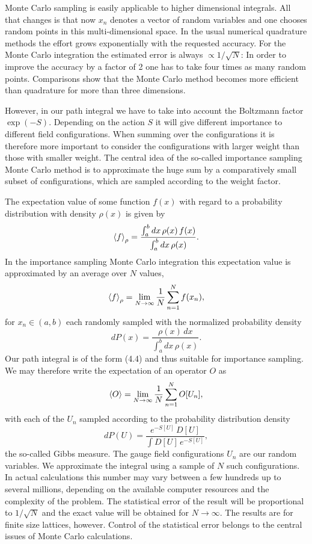 Monte Carlo sampling is easily applicable to higher dimensional integrals.
All that changes is that now $x_n$ denotes a vector of random variables and one
chooses random points in this multi-dimensional space. In the usual numerical
quadrature methods the effort grows exponentially with the requested accuracy. For the Monte Carlo integration the estimated error is always $\propto 1/\sqrt{N}$:
In order to improve the accuracy by a factor of 2 one has to take four times
as many random points. Comparisons show that the Monte Carlo method
becomes more efficient than quadrature for more than three dimensions.

However, in our path integral we have to take into account the Boltzmann
factor $\exp(-S)$. Depending on the action $S$ it will give different importance
to different field configurations. When summing over the configurations it is
therefore more important to consider the configurations with larger weight
than those with smaller weight. The central idea of the so-called importance
sampling Monte Carlo method is to approximate the huge sum by a comparatively small subset of configurations, which are sampled according to the
weight factor.

The expectation value of some function $f(x)$ with regard to a probability
distribution with density $\rho(x)$ is given by
\begin{equation}
  \left\langle f \right\rangle_\rho = \frac{\int_a^b dx\,\rho(x)\,f(x)}{\int_a^b dx\,\rho(x)}.
\end{equation}
In the importance sampling Monte Carlo integration this expectation value is
approximated by an average over $N$ values,
\begin{equation}
  \left\langle f \right\rangle_\rho = \lim_{N\to\infty}\frac{1}{N}\sum_{n=1}^{N} f(x_n),
\end{equation}
for $x_n \in (a,b)$ each randomly sampled with the normalized probability density
\begin{equation}
  dP(x) = \frac{\rho(x)\,dx}{\int_a^b dx\,\rho(x)}.
\end{equation}
Our path integral is of the form (4.4) and thus suitable for importance sampling. We may therefore write the expectation of an operator $O$ as
\begin{equation}
  \left\langle O \right\rangle = \lim_{N\to\infty}\frac{1}{N}\sum_{n=1}^{N} O[U_n],
\end{equation}
with each of the $U_n$ sampled according to the probability distribution density
\begin{equation}
  dP(U) = \frac{e^{-S[U]}\,D[U]}{\int D[U]\,e^{-S[U]}},
\end{equation}
the so-called Gibbs measure. The gauge field configurations $U_n$ are our random
variables. We approximate the integral using a sample of $N$ such configurations. In actual calculations this number may vary between a few hundreds
up to several millions, depending on the available computer resources and the
complexity of the problem. The statistical error of the result will be proportional to $1/\sqrt{N}$ and the exact value will be obtained for $N \to \infty$. The results
are for finite size lattices, however. Control of the statistical error belongs to
the central issues of Monte Carlo calculations.

